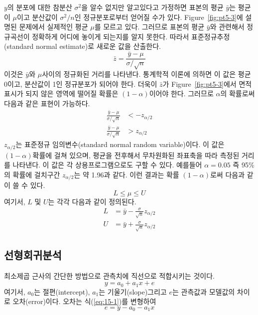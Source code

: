 $y$의 분포에 대한 참분산 $\sigma^2$을 알수 없지만 알고있다고 가정하면 표본의 평균 $\bar{y}$는 평균이 $\mu$이고 분산값이 $\sigma^2/n$인 정규분포로부터 얻어질 수가 있다. Figure~\ref{fig:pt5-3}에 설명된 문제에서 실제적인 평균 $\mu$를 모르고 있다. 그러므로 표본의 평균 $\bar{y}$와 관련해서 정규곡선이 정확하게 어디에 놓이게 되는지를 알지 못한다. 따라서 표준정규추정(standard normal estimate)로 새로운 값을 산출한다.
\begin{equation}\label{eq:pt5-6}
\bar{z}=\frac{\bar{y}-\mu}{\sigma/\sqrt{n}}
\end{equation}
이것은 $\bar{y}$와 $\mu$사이의 정규화된 거리를 나타낸다. 통계학적 이론에 의하면 이 값은 평균 0이고, 분산값이 1인 정규분포가 되어야 한다. 더욱이 $\bar{z}$가 Figure~\ref{fig:pt5-3}에서 면적표시가 되지 않은 영역에 떨어질 확률은 $(1-\alpha)$이어야 한다. 그러므로 $\alpha$의 확률로써 다음과 같은 표현이 가능하다.
\begin{align*}
\frac{\bar{y}-\mu}{\sigma/\sqrt{n}}&<-z_{\alpha/2}\\
\frac{\bar{y}-\mu}{\sigma/\sqrt{n}}&>z_{\alpha/2}
\end{align*}
$z_{\alpha/2}$는 표준정규 임의변수(standard normal random variable)이다. 이 값은 $(1-\alpha)$확률에 걸쳐 있으며, 평균을 전후해서 무차원화된 좌표축을 따라 측정된 거리를 나타낸다. 이 값은 각 상용프로그램으로도 구할 수 있다. 예를들어 $\alpha=0.05$ 즉 95\%의 확률에 걸치구간 $z_{\alpha/2}$는 약 1.96과 같다. 이런 결과는 확률 $(1-\alpha)$로써 다음과 같이 쓸 수 있다.
\begin{equation*}
L\leq\mu\leq U
\end{equation*}
여기서, $L$ 및 $U$는 각각 다음과 같이 정의된다.
\begin{align*}
L&=\bar{y}-\frac{\sigma}{\sqrt{n}}z_{\alpha/2}\\
U&=\bar{y}+\frac{\sigma}{\sqrt{n}}z_{\alpha/2}
\end{align*}
\subsection{선형회귀분석}
최소제곱 근사의 간단한 방법으로 관측치에 직선으로 적합시키는 것이다.
\begin{equation}\label{eq:15-1}
y=a_{0}+a_{1}x+e
\end{equation}
여기서, $a_{0}$는 절편(intercept), $a_{1}$는 기울기(slope)그리고 $e$는 관측값과 모델값의 차이로 오차(error)이다. 오차는 식(\ref{eq:15-1})를 변형하여
\begin{equation}
e=y-a_{0}-a_{1}x
\end{equation}
